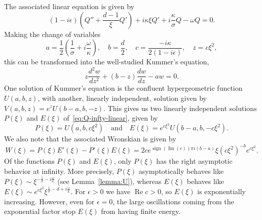 \documentclass[11pt]{article}
\DeclareMathOperator{\real}{Re}
\DeclareMathOperator{\imag}{Im}
\DeclareMathOperator{\sign}{sign}
\begin{document}
The associated linear equation is given by
\begin{equation}\label{eq:Q-infty-linear}
  (1 - i\epsilon)\left(Q'' + \frac{d - 1}{\xi}Q'\right) + i\kappa\xi Q' + i \frac{\kappa}{\sigma}Q - \omega Q = 0.
\end{equation}
Making the change of variables
\begin{equation}
  \label{eq:abc}
  a = \frac{1}{2}\left(\frac{1}{\sigma} + i \frac{\omega}{\kappa}\right),\quad
  b = \frac{d}{2},\quad
  c = \frac{-i \kappa}{2(1 - i\epsilon)},\quad
  z = c\xi^{2},
\end{equation}
this can be transformed into the well-studied Kummer's equation,
\begin{equation*}
  z \frac{d^{2}w}{dz^{2}} + (b - z)\frac{dw}{dz} - aw = 0.
\end{equation*}
One solution of Kummer's equation is the confluent hypergeometric
function \(U(a, b, z)\), with another, linearly independent, solution
given by \(V(a, b, z) = e^{z}U(b - a, b, -z)\). This gives us two
linearly independent solutions \(P(\xi)\) and \(E(\xi)\)
of~\eqref{eq:Q-infty-linear}, given by
\begin{equation*}
  P(\xi) = U(a, b, c\xi^{2}) \quad\text{and}\quad
  E(\xi) = e^{c\xi^{2}}U(b - a, b, -c\xi^{2}).
\end{equation*}
We also note that the associated Wronskian is given by
\begin{equation*}
  W(\xi) = P(\xi)E'(\xi) - P'(\xi)E(\xi) = 2ce^{\sign(\imag(c)) \pi i (b - a)}\xi \left(c\xi^{2}\right)^{-b}e^{c\xi^{2}}.
\end{equation*}
Of the functions \(P(\xi)\) and \(E(\xi)\), only \(P(\xi)\) has the
right asymptotic behavior at infinity. More precisely, \(P(\xi)\)
asymptotically behaves like
\(P(\xi) \sim \xi^{-\frac{1}{\sigma} - i \frac{\omega}{\kappa}}\) (see
Lemma~\ref{lemma:U}), whereas \(E(\xi)\) behaves like
\(E(\xi) \sim e^{c\xi^{2}}\xi^{\frac{1}{\sigma} - d +
  i\frac{\omega}{\kappa}}\). For \(\epsilon > 0\) we have
\(\real c > 0\), so \(E(\xi)\) is exponentially increasing. However,
even for \(\epsilon = 0\), the large oscillations coming from the
exponential factor stop \(E(\xi)\) from having finite energy.
\end{document}
